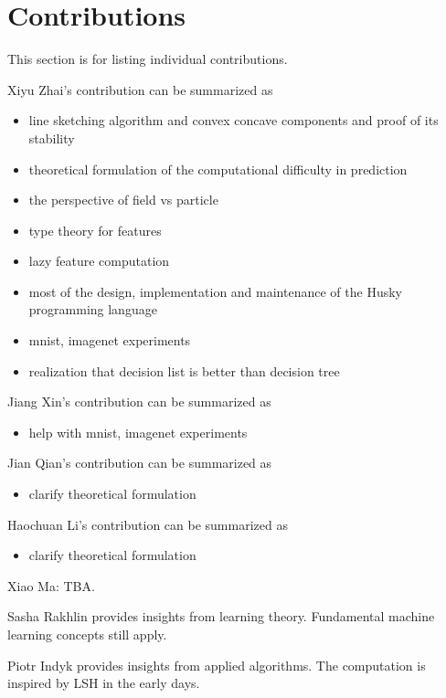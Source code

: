 \documentclass[11pt]{article} 	%
\theoremstyle{definition}
\begin{document}
\section{Contributions}

This section is for listing individual contributions.

Xiyu Zhai's contribution can be summarized as
\begin{itemize}
	\item line sketching algorithm and convex concave components and proof of its stability
	\item theoretical formulation of the computational difficulty in prediction
	\item the perspective of field vs particle
	\item type theory for features
	\item lazy feature computation
	\item most of the design, implementation and maintenance of the Husky programming language
	\item mnist, imagenet experiments
	\item realization that decision list is better than decision tree
\end{itemize}

Jiang Xin's contribution can be summarized as
\begin{itemize}
	\item help with mnist, imagenet experiments
\end{itemize}

Jian Qian's contribution can be summarized as
\begin{itemize}
	\item clarify theoretical formulation
\end{itemize}

Haochuan Li's contribution can be summarized as
\begin{itemize}
	\item clarify theoretical formulation
\end{itemize}

Xiao Ma: TBA.

Sasha Rakhlin provides insights from learning theory. Fundamental machine learning concepts still apply.

Piotr Indyk provides insights from applied algorithms. The computation is inspired by LSH in the early days.
\end{document}
